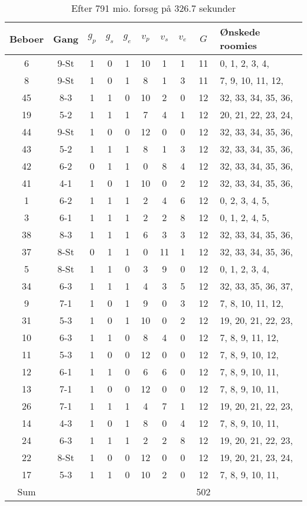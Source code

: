 \documentclass[article,oneside,11pt,a4paper]{memoir}
\newenvironment{assignment}[1]{
\begin{table}[h]
\caption{#1}
\footnotesize
\begin{center}
\begin{tabular}{cccccccccl}
\toprule
Beboer & Gang & $g_p$ & $g_s$ & $g_e$ & $v_p$ & $v_s$ & $v_e$ & $G$ & Ønskede roomies \\ \midrule
}{
\bottomrule
\end{tabular}
\end{center}
\end{table}

}
\begin{document}
\begin{assignment}{Efter 791 mio. forsøg på $326.7$ sekunder}
     6 & 9-St &   1 &   0 &   1 &  10 &   1 &   1 & 11 &   0,  1,  2,  3,  4, \\
     8 & 9-St &   1 &   0 &   1 &   8 &   1 &   3 & 11 &   7,  9, 10, 11, 12, \\
    45 & 8-3  &   1 &   1 &   0 &  10 &   2 &   0 & 12 &  32, 33, 34, 35, 36, \\
    19 & 5-2  &   1 &   1 &   1 &   7 &   4 &   1 & 12 &  20, 21, 22, 23, 24, \\
    44 & 9-St &   1 &   0 &   0 &  12 &   0 &   0 & 12 &  32, 33, 34, 35, 36, \\
    43 & 5-2  &   1 &   1 &   1 &   8 &   1 &   3 & 12 &  32, 33, 34, 35, 36, \\
    42 & 6-2  &   0 &   1 &   1 &   0 &   8 &   4 & 12 &  32, 33, 34, 35, 36, \\
    41 & 4-1  &   1 &   0 &   1 &  10 &   0 &   2 & 12 &  32, 33, 34, 35, 36, \\
     1 & 6-2  &   1 &   1 &   1 &   2 &   4 &   6 & 12 &   0,  2,  3,  4,  5, \\
     3 & 6-1  &   1 &   1 &   1 &   2 &   2 &   8 & 12 &   0,  1,  2,  4,  5, \\
    38 & 8-3  &   1 &   1 &   1 &   6 &   3 &   3 & 12 &  32, 33, 34, 35, 36, \\
    37 & 8-St &   0 &   1 &   1 &   0 &  11 &   1 & 12 &  32, 33, 34, 35, 36, \\
     5 & 8-St &   1 &   1 &   0 &   3 &   9 &   0 & 12 &   0,  1,  2,  3,  4, \\
    34 & 6-3  &   1 &   1 &   1 &   4 &   3 &   5 & 12 &  32, 33, 35, 36, 37, \\
     9 & 7-1  &   1 &   0 &   1 &   9 &   0 &   3 & 12 &   7,  8, 10, 11, 12, \\
    31 & 5-3  &   1 &   0 &   1 &  10 &   0 &   2 & 12 &  19, 20, 21, 22, 23, \\
    10 & 6-3  &   1 &   1 &   0 &   8 &   4 &   0 & 12 &   7,  8,  9, 11, 12, \\
    11 & 5-3  &   1 &   0 &   0 &  12 &   0 &   0 & 12 &   7,  8,  9, 10, 12, \\
    12 & 6-1  &   1 &   1 &   0 &   6 &   6 &   0 & 12 &   7,  8,  9, 10, 11, \\
    13 & 7-1  &   1 &   0 &   0 &  12 &   0 &   0 & 12 &   7,  8,  9, 10, 11, \\
    26 & 7-1  &   1 &   1 &   1 &   4 &   7 &   1 & 12 &  19, 20, 21, 22, 23, \\
    14 & 4-3  &   1 &   0 &   1 &   8 &   0 &   4 & 12 &   7,  8,  9, 10, 11, \\
    24 & 6-3  &   1 &   1 &   1 &   2 &   2 &   8 & 12 &  19, 20, 21, 22, 23, \\
    22 & 8-St &   1 &   0 &   0 &  12 &   0 &   0 & 12 &  19, 20, 21, 23, 24, \\
    17 & 5-3  &   1 &   1 &   0 &  10 &   2 &   0 & 12 &   7,  8,  9, 10, 11, \\
\midrule
Sum &&&&&&&& 502 & \\
\end{assignment}
\end{document}
